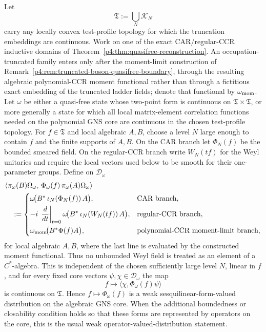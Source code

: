 \documentclass[12pt,a4paper]{article}
\begin{document}
\begin{proposition}
\label{p4:prop:weak-ovd-smeared-fields}
Let
\[
\mathfrak T:=\bigcup_N \mathcal K_N
\]
carry any locally convex test-profile topology for which the truncation
embeddings are continuous.  Work on one of the exact CAR/regular-CCR
inductive domains of
Theorem~\ref{p4:thm:quasifree-reconstruction}.  An occupation-truncated
family enters only after the moment-limit construction of
Remark~\ref{p4:rem:truncated-boson-quasifree-boundary}, through the resulting
algebraic polynomial-CCR moment functional rather than through a fictitious
exact embedding of the truncated ladder fields; denote that functional by
\(\omega_{\rm mom}\).
Let \(\omega\) be either a quasi-free state whose two-point form is
continuous on \(\mathfrak T\times\mathfrak T\), or more generally a state
for which all local matrix-element correlation functions needed on the
polynomial GNS core are continuous in the chosen test-profile topology.
For \(f\in\mathfrak T\) and local algebraic \(A,B\), choose a level \(N\)
large enough to contain \(f\) and the finite supports of \(A,B\).  On the
CAR branch let \(\Phi_N(f)\) be the bounded
smeared field.  On the regular-CCR branch write \(W_N(tf)\) for the Weyl
unitaries and require the local vectors used below to be smooth for their
one-parameter groups.  Define on \(\mathcal D_\omega\)
\[
\begin{aligned}
&\langle \pi_\omega(B)\Omega_\omega,\,
\Phi_\omega(f)\,\pi_\omega(A)\Omega_\omega\rangle\\
&\quad:=
\begin{cases}
\omega\!\bigl(B^*\,\iota_N(\Phi_N(f))\,A\bigr),
&\text{CAR branch},\\[1mm]
-i\,\displaystyle\left.\frac{d}{dt}\right|_{t=0}
\omega\!\bigl(B^*\,\iota_N(W_N(tf))\,A\bigr),
&\text{regular-CCR branch},\\[3mm]
\omega_{\rm mom}\!\bigl(B^*\Phi(f)A\bigr),
&\text{polynomial-CCR moment-limit branch},
\end{cases}
\end{aligned}
\]
for local algebraic \(A,B\), where the last line is evaluated by the
constructed moment functional.  Thus no unbounded Weyl field is treated as
an element of a \(C^*\)-algebra.
This is independent of the chosen sufficiently large level \(N\), linear in \(f\), and for every fixed core vectors \(\psi,\chi\in\mathcal D_\omega\) the map
\[
f\longmapsto \langle \chi,\Phi_\omega(f)\psi\rangle
\]
is continuous on \(\mathfrak T\).
Hence \(f\mapsto\Phi_\omega(f)\) is a weak sesquilinear-form-valued distribution on the algebraic GNS core.  When the additional boundedness or closability condition holds so that these forms are represented by operators on the core, this is the usual weak operator-valued-distribution statement.
\end{proposition}
\end{document}
